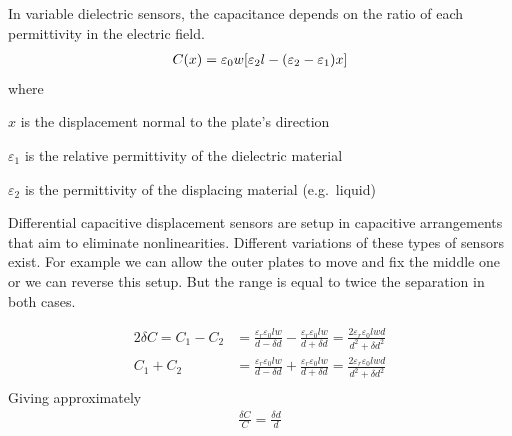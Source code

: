 In variable dielectric sensors, the capacitance depends on the ratio of each permittivity in the electric field.
\begin{align}
  C(x) &= \varepsilon_0 w \bqty{\varepsilon_2 l - \pqty{\varepsilon_2-\varepsilon_1}x}\label{eqn:var_diel_displace}\\
\end{align}
where
\begin{description}[topsep=0ex, noitemsep]
  \item $x$ is the displacement normal to the plate's direction
  \item $\varepsilon_1$ is the relative permittivity of the dielectric material
  \item $\varepsilon_2$ is the permittivity of the displacing material (e.g.\ liquid)
\end{description}
Differential capacitive displacement sensors are setup in capacitive arrangements that aim to eliminate nonlinearities. Different variations of these types of sensors exist. For example we can allow the outer plates to move and fix the middle one or we can reverse this setup. But the range is equal to twice the separation in both cases.

\begin{align}
  2\delta C = C_1-C_2 &= \frac{\varepsilon_r\varepsilon_0 lw}{d-\delta d} - \frac{\varepsilon_r\varepsilon_0 lw}{d+\delta d} = \frac{2\varepsilon_r\varepsilon_0 lwd}{d^2+\delta d^2}\\
  C_1+C_2 &= \frac{\varepsilon_r\varepsilon_0 lw}{d-\delta d} + \frac{\varepsilon_r\varepsilon_0 lw}{d+\delta d} = \frac{2\varepsilon_r\varepsilon_0 lwd}{d^2+\delta d^2}\\
\end{align}
Giving approximately
\begin{align}
  \frac{\delta C}{C} = \frac{\delta d}{d}
\end{align}

